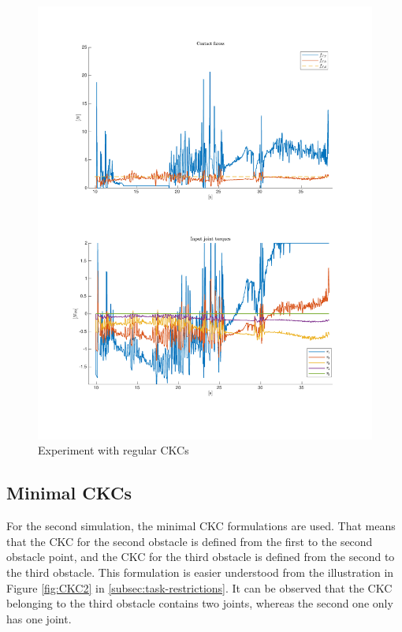 \begin{figure}
    \centering
    \includegraphics[trim=2cm 2cm 2cm 2cm, clip=true, width=\textwidth]{figures/experiments/2xf/bigJ-2plot.pdf}
    \caption{Experiment with regular CKCs}
    \label{fig:2xf-bigJ}
\end{figure}

\subsection{Minimal CKCs}

For the second simulation, the minimal CKC formulations are used. That means that the CKC for the second obstacle is defined from the first to the second obstacle point, and the CKC for the third obstacle is defined from the second to the third obstacle. This formulation is easier understood from the illustration in Figure \ref{fig:CKC2} in \ref{subsec:task-restrictions}. It can be observed that the CKC belonging to the third obstacle contains two joints, whereas the second one only has one joint.

